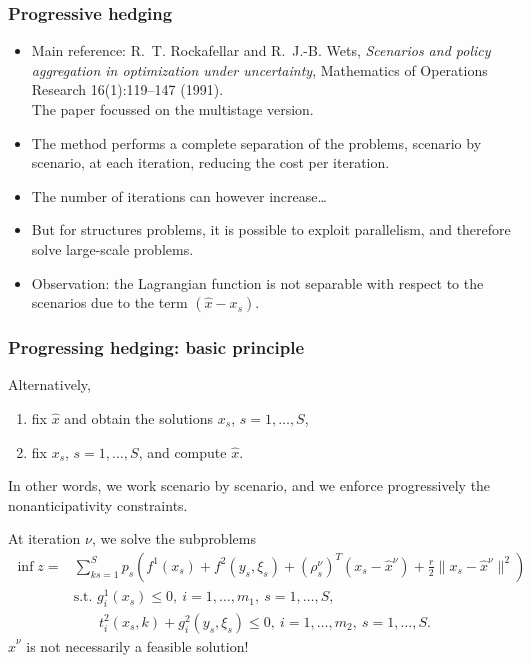 \documentclass[french]{beamer}
\begin{document}
\begin{frame}
\frametitle{Progressive hedging}

\begin{itemize}
\item
Main reference:
R.~T. Rockafellar and R.~J.-B. Wets, {\sl Scenarios and policy aggregation
in optimization under uncertainty}, Mathematics of Operations
  Research 16(1):119--147 (1991).\\
  The paper focussed on the multistage version.
\item
The method performs a complete separation of the problems, scenario by scenario, at each iteration, reducing the cost per iteration.
\item
The number of iterations can however increase\ldots
\item
But for structures problems, it is possible to exploit parallelism, and therefore solve large-scale problems.
\item
{\red Observation}:
the Lagrangian function is not separable with respect to the scenarios due to the term $(\hat{x}-x_s)$.
\end{itemize}

\end{frame}

\begin{frame}
\frametitle{Progressing hedging: basic principle}

Alternatively,
\begin{enumerate}
\item
fix $\hat{x}$ and obtain the solutions $x_s$, $s = 1,\ldots,S$,
\item
fix $x_s$, $s = 1,\ldots,S$, and compute $\hat{x}$.
\end{enumerate}
In other words, we work scenario by scenario, and we enforce progressively the nonanticipativity constraints.

\mbox{}

At iteration $\nu$, we solve the subproblems
\begin{align*}
\inf z = & \sum_{ks=1}^S p_s\left( f^1(x_s) + f^2\left(y_s,\xi_s\right) +
\left(\rho_s^{\nu}\right)^T\left(x_s-\hat{x}^{\nu}\right)+\frac{r}{2}\|
x_s-\hat{x}^{\nu} \|^2\right) \\
& \text{s.t. } g_i^1(x_s) \leq 0,\ i=1,\ldots{},m_1,\ s=1,\ldots{},S,\\
& \phantom{\text{t.q. }}
t_i^2\left(x_s,k\right)+g_i^2\left(y_s,\xi_s\right) \leq 0,\
i=1,\ldots{},m_2,\ s=1,\ldots{},S.
\end{align*}
$\hat{x}^{\nu}$ is not necessarily a feasible solution!

\end{frame}
\end{document}
